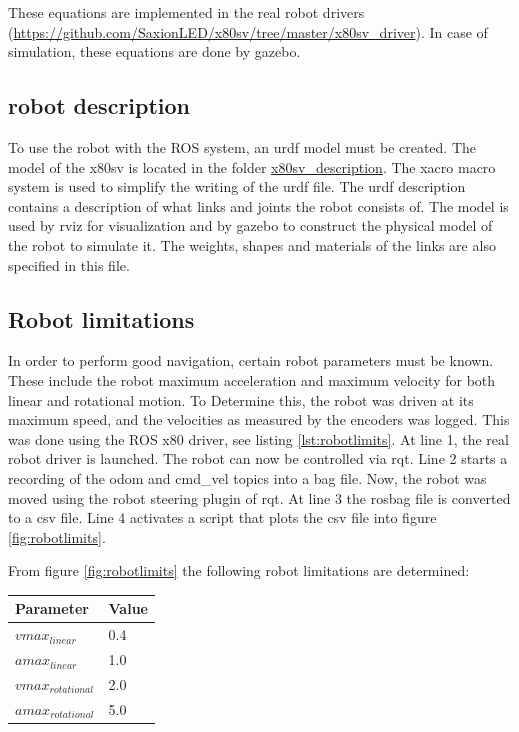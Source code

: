 \documentclass[a4paper]{article}
\begin{document}
These equations are implemented in the real robot drivers (\url{https://github.com/SaxionLED/x80sv/tree/master/x80sv_driver}). In case of simulation, these equations are done by gazebo.

\subsection{robot description}
To use the robot with the ROS system, an urdf model must be created. The model of the x80sv is
located in the folder \url{x80sv_description}. The xacro macro system is used to simplify the
writing of the urdf file. The urdf description contains a description of what links and joints
the robot consists of. The model is used by rviz for visualization and by gazebo to construct
the physical model of the robot to simulate it. The weights, shapes and materials of the links
are also specified in this file.

\subsection{Robot limitations}
In order to perform good navigation, certain robot parameters must be known. These include the
robot maximum acceleration and maximum velocity for both linear and rotational motion. To
Determine this, the robot was driven at its maximum speed, and the velocities as measured by
the encoders was logged. This was done using the ROS x80 driver, see listing \ref{lst:robotlimits}.
At line 1, the real robot driver is launched. The robot can now be controlled via rqt.
Line 2 starts a recording of the odom and cmd\_vel topics into a bag file. Now, the robot
was moved using the robot steering plugin of rqt. At line 3 the rosbag file is converted to
a csv file. Line 4 activates a script that plots the csv file into figure \ref{fig:robotlimits}.

From figure \ref{fig:robotlimits} the following robot limitations are determined:

\begin{tabular}{ | l | l | }
  \hline                       
  Parameter & Value \\
  \hline                       
  \hline                       
  $vmax_{linear}$ & 0.4 \\
  \hline                       
  $amax_{linear}$ & 1.0 \\
  \hline                       
  $vmax_{rotational}$ & 2.0 \\
  \hline                       
  $amax_{rotational}$ & 5.0 \\
  \hline  
\end{tabular}
\end{document}
